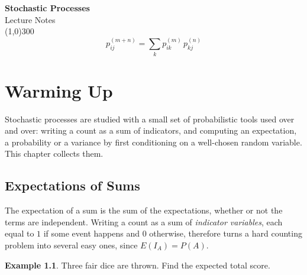 \documentclass[12pt,a4paper]{report}
\theoremstyle{definition}
\newtheorem{exa}[thm]{Example}
\begin{document}
\begin{titlepage}
\thispagestyle{empty}
\begin{center}
\vspace*{3cm}
{\Huge\bfseries Stochastic Processes}\\[1.2cm]
{\large Lecture Notes}\\[2.5cm]
\line(1,0){300}\\[1.5cm]
\[p_{ij}^{(m+n)} = \sum_{k} p_{ik}^{(m)}\,p_{kj}^{(n)}\]
\end{center}
\end{titlepage}

\tableofcontents
\thispagestyle{empty}
\clearpage
\setcounter{page}{1}



















\chapter{Warming Up}
\label{ch:warmup}

Stochastic processes are studied with a small set of probabilistic tools used over and
over: writing a count as a sum of indicators, and computing an expectation, a
probability or a variance by first conditioning on a well-chosen random variable. This
chapter collects them.

\section{Expectations of Sums}

The expectation of a sum is the sum of the expectations, whether or not the terms are
independent. Writing a count as a sum of \emph{indicator variables}, each equal to $1$ if
some event happens and $0$ otherwise, therefore turns a hard counting problem into
several easy ones, since $E(I_A) = P(A)$.

\begin{exa}
\label{ex:threedice}
Three fair dice are thrown. Find the expected total score.
\end{exa}
\end{document}
